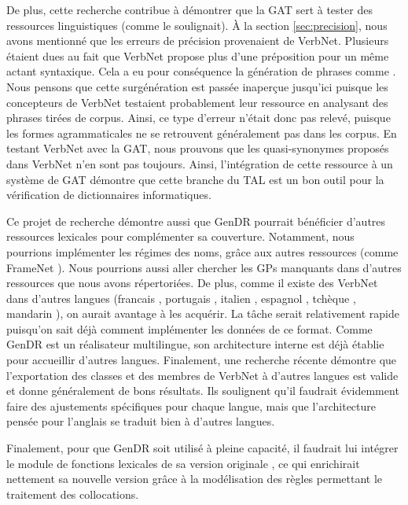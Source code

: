 De plus, cette recherche contribue à démontrer que la \ac{GAT} sert à tester des ressources linguistiques (comme \cite{DanlosPresentationmodelegeneration1983} le soulignait). À la section \ref{sec:precision}, nous avons mentionné que les erreurs de précision provenaient de VerbNet. Plusieurs étaient dues au fait que VerbNet propose plus d'une préposition pour un même actant syntaxique. Cela a eu pour conséquence la génération de phrases comme \ungr{}. Nous pensons que cette surgénération est passée inaperçue jusqu'ici puisque les concepteurs de VerbNet testaient probablement leur ressource en analysant des phrases tirées de corpus. Ainsi, ce type d'erreur n'était donc pas relevé, puisque les formes agrammaticales ne se retrouvent généralement pas dans les corpus. En testant VerbNet avec la \ac{GAT}, nous prouvons que les quasi-synonymes proposés dans VerbNet n'en sont pas toujours. Ainsi, l'intégration de cette ressource à un système de \ac{GAT} démontre que cette branche du \ac{TAL} est un bon outil pour la vérification de dictionnaires informatiques.

Ce projet de recherche démontre aussi que GenDR pourrait bénéficier d'autres ressources lexicales pour complémenter sa couverture. Notamment, nous pourrions implémenter les régimes des noms, grâce aux autres ressources (comme FrameNet \cite{FillmoreBackgroundFramenet2003a}). Nous pourrions aussi aller chercher les \acp{GP} manquants dans d'autres ressources que nous avons répertoriées. De plus, comme il existe des VerbNet dans d'autres langues (francais \citep{danlos:hal-01179175}, portugais \citep{ScartoncrosslinguisticVerbNetstylelexicon2012}, italien \citep{busso2016italian}, espagnol \citep{TauleAnCoraNetMappingSpanish2010}, tchèque \citep{pala2008can}, mandarin \citep{liu2008construction}), on aurait avantage à les acquérir. La tâche serait relativement rapide puisqu'on sait déjà comment implémenter les données de ce format. Comme GenDR est un réalisateur multilingue, son architecture interne est déjà établie pour accueillir d'autres langues. Finalement, une recherche récente \citep{Majewska2017} démontre que l'exportation des classes et des membres de VerbNet \citep{SchulerVerbnetBroadcoverageComprehensive2005} à d'autres langues est valide et donne généralement de bons résultats. Ils soulignent qu'il faudrait évidemment faire des ajustements spécifiques pour chaque langue, mais que l'architecture pensée pour l'anglais se traduit bien à d'autres langues. 

Finalement, pour que GenDR soit utilisé à pleine capacité, il faudrait lui intégrer le module de fonctions lexicales de sa version originale \citep{LambreyImplementationcollocationspour2017, lareau18}, ce qui enrichirait nettement sa nouvelle version grâce à la modélisation des règles permettant le traitement des collocations.